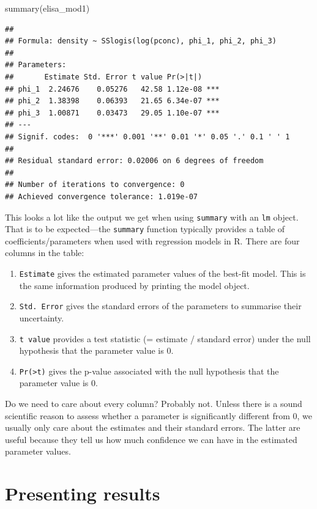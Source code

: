 \documentclass[
]{book}
\newenvironment{Shaded}{\begin{snugshade}}{\end{snugshade}}
\newcommand{\FunctionTok}[1]{\textcolor[rgb]{0.00,0.00,0.00}{#1}}
\newcommand{\NormalTok}[1]{#1}
\providecommand{\tightlist}{%
  \setlength{\itemsep}{0pt}\setlength{\parskip}{0pt}}
\begin{document}
\begin{Shaded}
\begin{Highlighting}[]
\FunctionTok{summary}\NormalTok{(elisa\_mod1)}
\end{Highlighting}
\end{Shaded}

\begin{verbatim}
## 
## Formula: density ~ SSlogis(log(pconc), phi_1, phi_2, phi_3)
## 
## Parameters:
##       Estimate Std. Error t value Pr(>|t|)    
## phi_1  2.24676    0.05276   42.58 1.12e-08 ***
## phi_2  1.38398    0.06393   21.65 6.34e-07 ***
## phi_3  1.00871    0.03473   29.05 1.10e-07 ***
## ---
## Signif. codes:  0 '***' 0.001 '**' 0.01 '*' 0.05 '.' 0.1 ' ' 1
## 
## Residual standard error: 0.02006 on 6 degrees of freedom
## 
## Number of iterations to convergence: 0 
## Achieved convergence tolerance: 1.019e-07
\end{verbatim}

This looks a lot like the output we get when using \texttt{summary} with an \texttt{lm} object. That is to be expected---the \texttt{summary} function typically provides a table of coefficients/parameters when used with regression models in R. There are four columns in the table:

\begin{enumerate}
\def\labelenumi{\arabic{enumi}.}
\tightlist
\item
  \texttt{Estimate} gives the estimated parameter values of the best-fit model. This is the same information produced by printing the model object.
\item
  \texttt{Std.\ Error} gives the standard errors of the parameters to summarise their uncertainty.
\item
  \texttt{t\ value} provides a test statistic (= estimate / standard error) under the null hypothesis that the parameter value is 0.
\item
  \texttt{Pr(\textgreater{}\textbar{}t\textbar{})} gives the p-value associated with the null hypothesis that the parameter value is 0.
\end{enumerate}

Do we need to care about every column? Probably not. Unless there is a sound scientific reason to assess whether a parameter is significantly different from 0, we usually only care about the estimates and their standard errors. The latter are useful because they tell us how much confidence we can have in the estimated parameter values.

\hypertarget{present-results}{%
\section{Presenting results}\label{present-results}}
\end{document}
